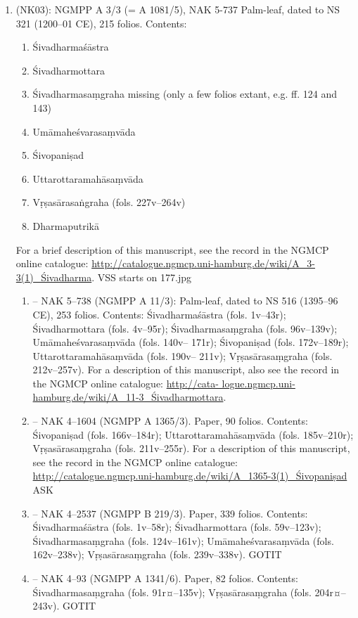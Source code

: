 \documentclass[11pt]{article}
\begin{document}
\begin{enumerate}
\item \msNd (NK03): NGMPP A 3/3 (= A 1081/5), NAK 5-737
\label{sec:org0227172}
Palm-leaf, dated to NS 321 (1200--01 CE), 215 folios.
Contents: 
\begin{enumerate}
\item Śivadharmaśāstra
\item Śivadharmottara
\item Śivadharmasaṃgraha missing (only a few folios extant, e.g. ff. 124 and 143)
\item Umāmaheśvarasaṃvāda
\item Śivopaniṣad
\item Uttarottaramahāsaṃvāda
\item Vṛṣasārasaṅgraha (fols. 227v--264v)
\item Dharmaputrikā
\end{enumerate}
         For a brief  description of this manuscript, see the record in the NGMCP online catalogue: 
\url{http://catalogue.ngmcp.uni-hamburg.de/wiki/A\_3-3(1)\_Śivadharma}.
VSS starts on 177.jpg

\begin{enumerate}
\item -- NAK 5--738 (NGMPP A 11/3): Palm-leaf, dated to NS 516 (1395--96 CE), 253 folios.  Contents: 
Śivadharmaśāstra (fols. 1v--43r); Śivadharmottara (fols. 4v--95r); Śivadharmasaṃgraha (fols. 96v--139v); 
Umāmaheśvarasaṃvāda (fols. 140v-- 171r); Śivopaniṣad (fols. 172v--189r); Uttarottaramahāsaṃvāda (fols. 
190v-- 211v); Vṛṣasārasaṃgraha (fols. 212v--257v). For a description of this manuscript, also see the 
record in the NGMCP online catalogue: \url{http://cata- logue.ngmcp.uni-hamburg.de/wiki/A\_11-3\_Śivadharmottara}.

\item -- NAK 4--1604 (NGMPP A 1365/3). Paper, 90 folios. Contents: Śivopaniṣad (fols.
166v--184r); Uttarottaramahāsaṃvāda (fols. 185v--210r); Vṛṣasārasaṃgraha
(fols. 211v--255r). For a description of this manuscript, see the record in the
NGMCP online catalogue: \url{http://catalogue.ngmcp.uni-hamburg.de/wiki/A\_1365-3(1)\_Śivopaniṣad}  ASK

\item -- NAK 4--2537 (NGMPP B 219/3). Paper, 339 folios. Contents: Śivadharmaśāstra (fols. 1v--58r); 
Śivadharmottara (fols. 59v--123v); Śivadharmasaṃgraha (fols.  124v--161v); Umāmaheśvarasaṃvāda (fols. 
162v--238v); Vṛṣasārasaṃgraha (fols. 239v--338v). GOTIT

\item -- NAK 4--93 (NGMPP A 1341/6). Paper, 82 folios. Contents: Śivadharmasaṃgraha (fols. 91r¤--135v); 
Vṛṣasārasaṃgraha (fols. 204r¤--243v). GOTIT
\end{enumerate}



\end{enumerate}
\end{document}
